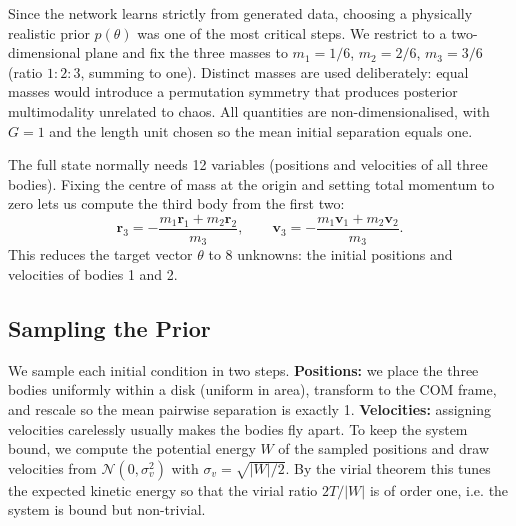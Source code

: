 \documentclass[12pt]{article}
\begin{document}
Since the network learns strictly from generated data, choosing a physically realistic
prior $p(\theta)$ was one of the most critical steps. We restrict to a two-dimensional
plane and fix the three masses to $m_1 = 1/6$, $m_2 = 2/6$, $m_3 = 3/6$ (ratio $1:2:3$,
summing to one). Distinct masses are used deliberately: equal masses would introduce a
permutation symmetry that produces posterior multimodality unrelated to chaos. All
quantities are non-dimensionalised, with $G=1$ and the length unit chosen so the mean
initial separation equals one.
 
The full state normally needs 12 variables (positions and velocities of all three
bodies). Fixing the centre of mass at the origin and setting total momentum to zero lets
us compute the third body from the first two:
\begin{equation}
    \mathbf{r}_3 = -\frac{m_1\mathbf{r}_1 + m_2\mathbf{r}_2}{m_3}, \qquad
    \mathbf{v}_3 = -\frac{m_1\mathbf{v}_1 + m_2\mathbf{v}_2}{m_3}.
\end{equation}
This reduces the target vector $\theta$ to 8 unknowns: the initial positions and
velocities of bodies 1 and 2.
 
\subsection{Sampling the Prior}
We sample each initial condition in two steps. \textbf{Positions:} we place the three
bodies uniformly within a disk (uniform in area), transform to the COM frame, and rescale
so the mean pairwise separation is exactly 1. \textbf{Velocities:} assigning velocities
carelessly usually makes the bodies fly apart. To keep the system bound, we compute the
potential energy $W$ of the sampled positions and draw velocities from
$\mathcal{N}(0, \sigma_v^2)$ with $\sigma_v = \sqrt{|W|/2}$. By the virial theorem this
tunes the expected kinetic energy so that the virial ratio $2T/|W|$ is of order one, i.e.
the system is bound but non-trivial.
 
\end{document}
